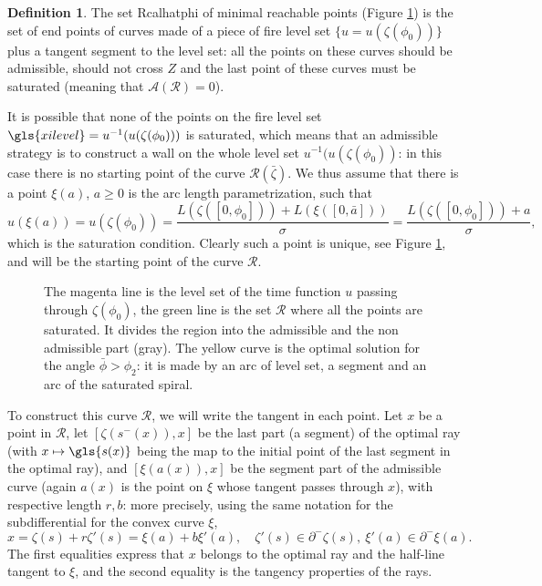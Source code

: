 \documentclass[reqno]{amsart}
\newcounter{assu}
\theoremstyle{definition} \newtheorem{definition}{Definition}[section]
\theoremstyle{definition} \newtheorem{remark}[definition]{Remark}
\theoremstyle{plain} \newtheorem{lemma}[definition]{Lemma}
\theoremstyle{plain} \newtheorem{proposition}[definition]{Proposition}
\theoremstyle{plain} \newtheorem{theorem}[definition]{Theorem}
\theoremstyle{plain} \newtheorem{corollary}[definition]{Corollary}
\theoremstyle{definition} \newtheorem{example}[definition]{Example}
\theoremstyle{plain} \newtheorem{claim}[clai]{Claim}
\theoremstyle{definition} \newtheorem{assumption}[definition]{Assumption}
\theoremstyle{definition} \newtheorem{observation}[definition]{Observation}
\newcommand{\1}{\mathbbm 1}
\numberwithin{equation}{section} %
\theoremstyle{plain} \newtheorem*{theorem*}{Theorem}
\theoremstyle{plain} \newtheorem{mthm}[maintheorem]{Main Theorem}
\theoremstyle{plain} \newtheorem*{mthm*}{Main Theorem}
\theoremstyle{plain} \newtheorem*{conjecture*}{Conjecture}
\theoremstyle{plain} \newtheorem{conjecture}[definition]{Conjecture}
\theoremstyle{plain} \newtheorem*{problem*}{Problem}
\begin{document}
\begin{definition}
\label{Def:minmi_reach_points}
The set  {\gls{Rcalhatphi} of minimal reachable points} (Figure \ref{fig:best:first:1}) is the set of end points of curves made of a piece of fire level set $\lbrace u=u(\zeta({\phi_0}))\rbrace$ plus a tangent segment to the level set: all the points on these curves should be admissible, should not cross $Z$ and the last point of these curves must be saturated (meaning that $\mathcal A(\mathcal R) = 0$).
\end{definition}

It is possible that none of the points on the fire level set  $\gls{xilevel} = u^{-1}(u(\zeta({\phi_0})))$ is saturated, which means that an admissible strategy is to construct a wall on the whole level set $u^{-1}(u(\zeta({\phi_0}))$: in this case there is no starting point of the curve $\mathcal{R}(\bar\zeta)$. We thus assume that there is a point $\xi(a)$, $a \geq 0$ is the arc length parametrization, such that
\begin{equation*}
u(\xi(a)) = u(\zeta({\phi_0})) = \frac{L(\zeta([0,{\phi_0}])) + L(\xi([0,\bar a]))}{\sigma} = \frac{L(\zeta([0,{\phi_0}])) + a}{\sigma},
\end{equation*}
which is the saturation condition. Clearly such a point is unique, see Figure \ref{fig:best:first:1}, and will be the starting point of the curve $\mathcal R$.

\begin{figure}
\centering
\resizebox{.75\textwidth}{!}{}
\caption{The magenta line is the level set of the time function $u$ passing through $\zeta({\phi_0})$, the green line is the set $\mathcal{R}$ where all the points are saturated. It divides the region into the admissible and the non admissible part (gray). The yellow curve is the optimal solution for the angle $\bar \phi > \phi_2$: it is made by an arc of level set, a segment and an arc of the saturated spiral.}
\label{fig:best:first:1}
\end{figure}

To construct this curve $\mathcal R$, we will write the tangent in each point. Let $x$ be a point in $\mathcal R$, let $[\zeta(s^-(x)),x]$ be the last part (a segment) of the optimal ray (with  $x \mapsto \gls{s(x)}$ being the map to the initial point of the last segment in the optimal ray), and $[\xi(a(x)),x]$ be the segment part of the admissible curve (again $a(x)$ is the point on $\xi$ whose tangent passes through $x$), with respective length $r,b$: more precisely, using the same notation for the subdifferential for the convex curve $\xi$,
$$
x = \zeta(s) + r \zeta'(s) = \xi(a) + b \xi'(a), \quad \zeta'(s) \in \partial^- \zeta(s), \ \xi'(a) \in \partial^- \xi(a).
$$
The first equalities express that $x$ belongs to the optimal ray and the half-line tangent to $\xi$, and the second equality is the tangency properties of the rays.
\end{document}
